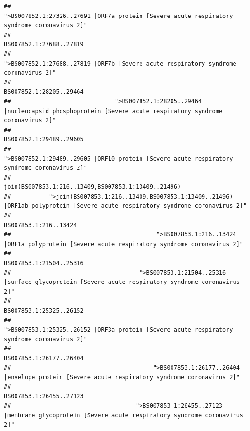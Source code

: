 \documentclass[
]{article}
\begin{document}
\begin{verbatim}
##                                            ">BS007852.1:27326..27691 |ORF7a protein [Severe acute respiratory syndrome coronavirus 2]" 
##                                                                                                                BS007852.1:27688..27819 
##                                                    ">BS007852.1:27688..27819 |ORF7b [Severe acute respiratory syndrome coronavirus 2]" 
##                                                                                                                BS007852.1:28205..29464 
##                              ">BS007852.1:28205..29464 |nucleocapsid phosphoprotein [Severe acute respiratory syndrome coronavirus 2]" 
##                                                                                                                BS007852.1:29489..29605 
##                                            ">BS007852.1:29489..29605 |ORF10 protein [Severe acute respiratory syndrome coronavirus 2]" 
##                                                                                    join(BS007853.1:216..13409,BS007853.1:13409..21496) 
##           ">join(BS007853.1:216..13409,BS007853.1:13409..21496) |ORF1ab polyprotein [Severe acute respiratory syndrome coronavirus 2]" 
##                                                                                                                  BS007853.1:216..13424 
##                                          ">BS007853.1:216..13424 |ORF1a polyprotein [Severe acute respiratory syndrome coronavirus 2]" 
##                                                                                                                BS007853.1:21504..25316 
##                                     ">BS007853.1:21504..25316 |surface glycoprotein [Severe acute respiratory syndrome coronavirus 2]" 
##                                                                                                                BS007853.1:25325..26152 
##                                            ">BS007853.1:25325..26152 |ORF3a protein [Severe acute respiratory syndrome coronavirus 2]" 
##                                                                                                                BS007853.1:26177..26404 
##                                         ">BS007853.1:26177..26404 |envelope protein [Severe acute respiratory syndrome coronavirus 2]" 
##                                                                                                                BS007853.1:26455..27123 
##                                    ">BS007853.1:26455..27123 |membrane glycoprotein [Severe acute respiratory syndrome coronavirus 2]" 

\end{verbatim}
\end{document}
